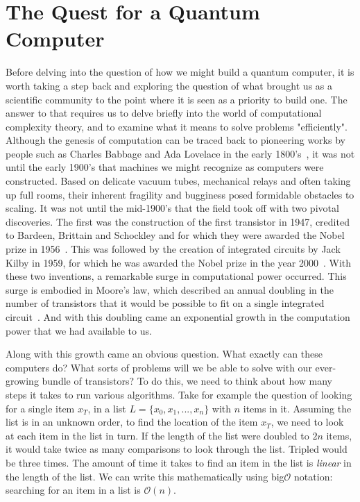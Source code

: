 \chapter{The Quest for a Quantum Computer}
Before delving into the question of how we might build a quantum computer, it is worth taking a step
back and exploring the question of what brought us as a scientific community to the point where
it is seen as a priority to build one. The answer to that requires us to delve briefly into
the world of computational complexity theory, and to examine what it means to solve problems "efficiently".
Although the genesis of computation can be traced back to pioneering works by people such as Charles Babbage
and Ada Lovelace in the early 1800's~\cite{Bowden:1953:FTS:1102044}, it was not until the early 1900's that
machines we might recognize as computers were constructed. Based on delicate vacuum tubes, mechanical relays
and often taking up full rooms, their inherent fragility and bugginess posed formidable obstacles to scaling.
It was not until the mid-1900's that the field took off with two pivotal discoveries. The first
was the construction of the first transistor in 1947, credited to Bardeen, Brittain and Schockley and for which
they were awarded the Nobel prize in 1956~\cite{nobel1956}. This was followed by the creation of integrated circuits by Jack Kilby
in 1959, for which he was awarded the Nobel prize in the year 2000~\cite{nobel2000}. With these two inventions, a remarkable
surge in computational power occurred. This surge is embodied in Moore's law, which described an annual
doubling in the number of transistors that it would be possible to fit on a single integrated circuit~\cite{4785860}.
And with this doubling came an exponential growth in the computation power that we had available to us.

Along with this growth came an obvious question. What exactly can these computers do? What sorts of
problems will we be able to solve with our ever-growing bundle of transistors? To do this, we need to
think about how many steps it takes to run various algorithms. Take for example the question of looking
for a single item $x_T$, in a list $L = \{x_0, x_1, ..., x_n\}$ with $n$ items in it. Assuming the list
is in an unknown order, to find the location of the item $x_T$, we need to look at each item in the list
in turn. If the length of the list were doubled to $2n$ items, it would take twice as many comparisons to
look through the list. Tripled would be three times. The amount of time it takes to find an item in the
list is \emph{linear} in the length of the list. We can write this mathematically using big$\mathcal{O}$
notation: searching for an item in a list is $\mathcal{O}(n)$.

